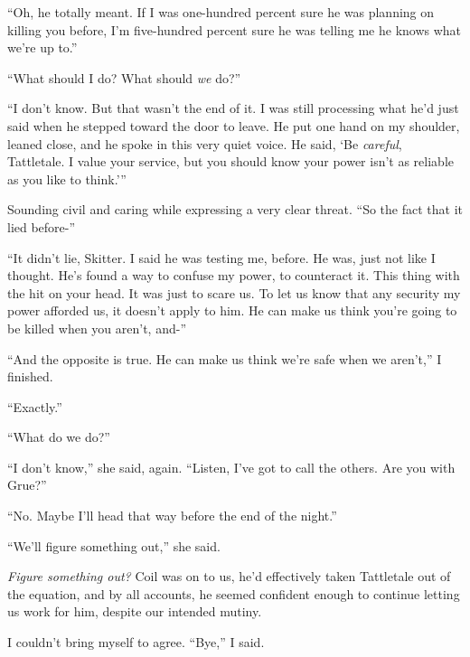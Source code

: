 ``Oh, he totally meant.  If I was one-hundred percent sure he was planning on killing you before, I'm five-hundred percent sure he was telling me he knows what we're up to.''



``What should I do?  What should \emph{we} do?''



``I don't know.  But that wasn't the end of it.  I was still processing what he'd just said when he stepped toward the door to leave.  He put one hand on my shoulder, leaned close, and he spoke in this very quiet voice.  He said, `Be \emph{careful}, Tattletale.  I value your service, but you should know your power isn't as reliable as you like to think.'''



Sounding civil and caring while expressing a very clear threat.  ``So the fact that it lied before-''



``It didn't lie, Skitter.  I said he was testing me, before.  He was, just not like I thought.  He's found a way to confuse my power, to counteract it.  This thing with the hit on your head.  It was just to scare us.  To let us know that any security my power afforded us, it doesn't apply to him.  He can make us think you're going to be killed when you aren't, and-''



``And the opposite is true.  He can make us think we're safe when we aren't,'' I finished.



``Exactly.''



``What do we do?''



``I don't know,'' she said, again.  ``Listen, I've got to call the others.  Are you with Grue?''



``No.  Maybe I'll head that way before the end of the night.''



``We'll figure something out,'' she said.



\emph{Figure something out?}  Coil was on to us, he'd effectively taken Tattletale out of the equation, and by all accounts, he seemed confident enough to continue letting us work for him, despite our intended mutiny.



I couldn't bring myself to agree.  ``Bye,'' I said.



